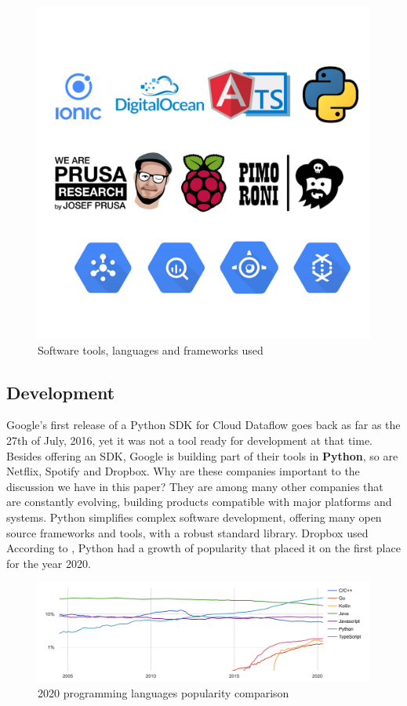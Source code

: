 \begin{figure}[!htb]
    \centering
    \includegraphics[width = 12cm]{figures/tools.jpg}
    \caption{Software tools, languages and frameworks used}
    \label{fig:app_flow}
\end{figure}

\subsection*{Development}

Google's first release of a Python SDK for Cloud Dataflow goes back as far as the 27th of July, 2016, yet it was not a tool ready for development at that time. Besides offering an SDK, Google is building part of their tools in \textbf{Python}, so are Netflix, Spotify and Dropbox. Why are these companies important to the discussion we have in this paper? They are among many other companies that are constantly evolving, building products compatible with major platforms and systems. Python simplifies complex software development, offering many open source frameworks and tools, with a robust standard library. Dropbox used  According to \cite{pypl}, Python had a growth of popularity that placed it on the first place for the year 2020.

\begin{figure}[!htb]
    \centering
    \includegraphics[width = 15.5cm]{figures/python_pop}
    \caption{2020 programming languages popularity comparison \cite{pypl}}
    \label{fig:f1}
\end{figure}


